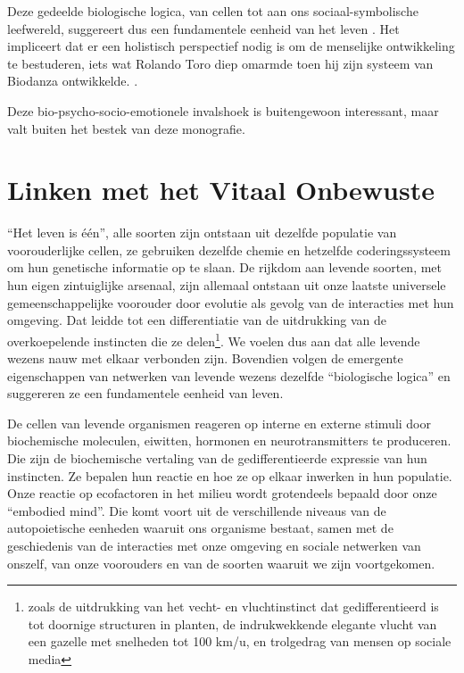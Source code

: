 \documentclass[
  11pt,
]{book}
\begin{document}
Deze gedeelde biologische logica, van cellen tot aan ons sociaal-symbolische leefwereld, suggereert dus een fundamentele eenheid van het leven \citep{capraLuisi2014}. Het impliceert dat er een holistisch perspectief nodig is om de menselijke ontwikkeling te bestuderen, iets wat Rolando Toro diep omarmde toen hij zijn systeem van Biodanza ontwikkelde. .

Deze bio-psycho-socio-emotionele invalshoek is buitengewoon interessant, maar valt buiten het bestek van deze monografie.

\hypertarget{linken-met-het-vitaal-onbewuste}{%
\section{Linken met het Vitaal Onbewuste}\label{linken-met-het-vitaal-onbewuste}}

``Het leven is één'', alle soorten zijn ontstaan uit dezelfde populatie van voorouderlijke cellen, ze gebruiken dezelfde chemie en hetzelfde coderingssysteem om hun genetische informatie op te slaan. De rijkdom aan levende soorten, met hun eigen zintuiglijke arsenaal, zijn allemaal ontstaan uit onze laatste universele gemeenschappelijke voorouder door evolutie als gevolg van de interacties met hun omgeving. Dat leidde tot een differentiatie van de uitdrukking van de overkoepelende instincten die ze delen\footnote{zoals de uitdrukking van het vecht- en vluchtinstinct dat gedifferentieerd is tot doornige structuren in planten, de indrukwekkende elegante vlucht van een gazelle met snelheden tot 100 km/u, en trolgedrag van mensen op sociale media}. We voelen dus aan dat alle levende wezens nauw met elkaar verbonden zijn. Bovendien volgen de emergente eigenschappen van netwerken van levende wezens dezelfde ``biologische logica'' en suggereren ze een fundamentele eenheid van leven.

De cellen van levende organismen reageren op interne en externe stimuli door biochemische moleculen, eiwitten, hormonen en neurotransmitters te produceren. Die zijn de biochemische vertaling van de gedifferentieerde expressie van hun instincten. Ze bepalen hun reactie en hoe ze op elkaar inwerken in hun populatie. Onze reactie op ecofactoren in het milieu wordt grotendeels bepaald door onze ``embodied mind''. Die komt voort uit de verschillende niveaus van de autopoietische eenheden waaruit ons organisme bestaat, samen met de geschiedenis van de interacties met onze omgeving en sociale netwerken van onszelf, van onze voorouders en van de soorten waaruit we zijn voortgekomen.
\end{document}
